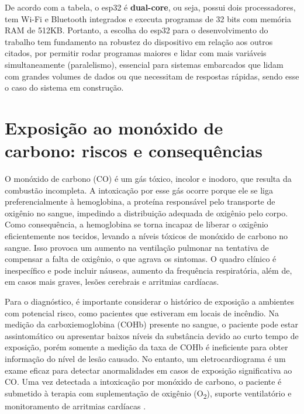 De acordo com a tabela, o esp32 é \textbf{dual-core}, ou seja, possui dois processadores, tem Wi-Fi e Bluetooth 
integrados e executa programas de 32 bits com memória RAM de 512KB. Portanto, a escolha do esp32 para o desenvolvimento 
do trabalho tem fundamento na robustez do dispositivo em relação aos outros citados, por permitir rodar programas maiores e lidar com mais variáveis simultaneamente (paralelismo), 
essencial para sistemas embarcados que lidam com grandes volumes de dados ou que necessitam de respostas rápidas, sendo esse o caso do sistema em construção. 

\section{Exposição ao monóxido de carbono: riscos e consequências}

O monóxido de carbono (CO) é um gás tóxico, incolor e inodoro, que resulta da combustão incompleta. A intoxicação por esse gás ocorre porque ele se liga preferencialmente à hemoglobina, a proteína 
responsável pelo transporte de oxigênio no sangue, impedindo a distribuição adequada de oxigênio pelo corpo. Como consequência, a hemoglobina se 
torna incapaz de liberar o oxigênio eficientemente nos tecidos, levando a níveis tóxicos de monóxido de carbono no sangue. Isso provoca um aumento na ventilação 
pulmonar na tentativa de compensar a falta de oxigênio, o que agrava os sintomas. O quadro clínico é inespecífico e pode incluir náuseas, aumento da 
frequência respiratória, além de, em casos mais graves, lesões cerebrais e arritmias cardíacas.

Para o diagnóstico, é importante considerar o histórico de exposição a ambientes com potencial risco, como pacientes que estiveram em locais de incêndio. Na medição 
da carboxiemoglobina (COHb) presente no sangue, o paciente pode estar assintomático ou apresentar baixos níveis da substância devido ao curto tempo de exposição, porém somente a medição da taxa de COHb é 
ineficiente para obter informação do nível de lesão causado. No entanto, um eletrocardiograma é um exame eficaz para detectar anormalidades em casos de exposição significativa ao CO. Uma vez detectada 
a intoxicação por monóxido de carbono, o paciente é submetido à terapia com suplementação de oxigênio (O\textsubscript{2}), suporte ventilatório e monitoramento de arritmias cardíacas \cite{carbon-monoxide-poisoning-varon}.

